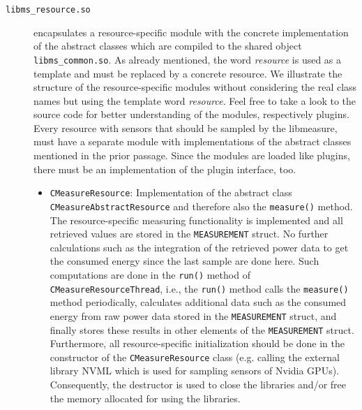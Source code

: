 \begin{description}
	\item[\texttt{libms\_resource.so}] encapsulates a resource-specific module with the concrete implementation of the abstract classes which are compiled to the shared object \texttt{libms\_common.so}. As already mentioned, the word \textit{resource} is used as a template and must be replaced by a concrete resource. We  illustrate the structure of the resource-specific modules without considering the real class names but using the template word \textit{resource}. Feel free to take a look to the source code for better understanding of the modules, respectively plugins.\\
	Every resource with sensors that should be sampled by the libmeasure, must have a separate module with implementations of the abstract classes mentioned in the prior passage. Since the modules are loaded like plugins, there must be an implementation of the plugin interface, too.
	\begin{itemize}
		\item \texttt{CMeasureResource}: Implementation of the abstract class\\\texttt{CMeasureAbstractResource} and therefore also the \texttt{measure()} method. The resource-specific measuring functionality is implemented and all retrieved values are stored in the \texttt{MEASUREMENT} struct. No further calculations such as the integration of the retrieved power data to get the consumed energy since the last sample are done here. Such computations are done in the \texttt{run()} method of \texttt{CMeasureResourceThread}, i.e., the \texttt{run()} method calls the \texttt{measure()} method periodically, calculates additional data such as the consumed energy from raw power data stored in the \texttt{MEASUREMENT} struct, and finally stores these results in other elements of the \texttt{MEASUREMENT} struct. Furthermore, all resource-specific initialization should be done in the constructor of the \texttt{CMeasureResource} class (e.g. calling the external library NVML which is used for sampling sensors of Nvidia GPUs). Consequently, the destructor is used to close the libraries and/or free the memory allocated for using the libraries. 
		

\end{itemize}
\end{description}
